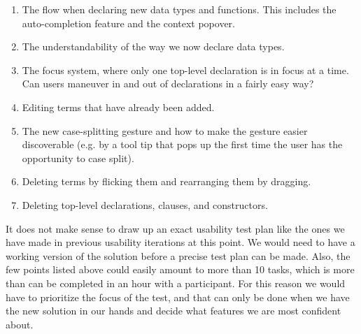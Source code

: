 \begin{enumerate}
	\item The flow when declaring new data types and functions. This includes the auto-completion feature and the context popover.
	\item The understandability of the way we now declare data types.
	\item The focus system, where only one top-level declaration is in focus at a
	time. Can users maneuver in and out of declarations in a fairly easy way?
	\item Editing terms that have already been added.
	\item The new case-splitting gesture and how to make the gesture easier
	discoverable (e.g. by a tool tip that pops up the first time the user has the
	opportunity to case split).
	\item Deleting terms by flicking them and rearranging them by dragging.
	\item Deleting top-level declarations, clauses, and constructors.
\end{enumerate}

It does not make sense to draw up an exact usability test plan like the ones we have made in previous usability
iterations
at this point. We would need to have a working version of the solution before a precise test plan can be made. Also, the few points listed above could easily amount to more than 10 tasks, which is more than can be completed in an hour with a participant. For this reason we would have to prioritize the focus of the test, and that can only be done when we have the new solution in our hands and decide what features we are most confident about. 
